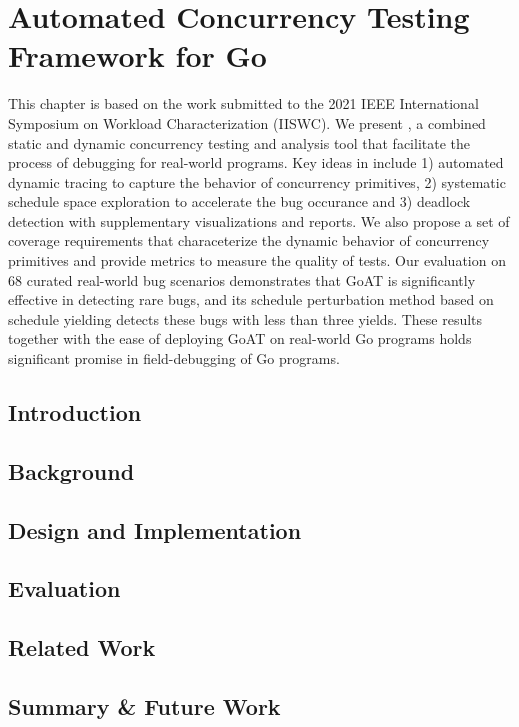 
\chapter{Automated Concurrency Testing Framework for Go}
\label{sec:ch4}

This chapter is based on the work submitted to the 2021 IEEE International Symposium on Workload Characterization (IISWC).
We present \goat, a combined static and dynamic concurrency testing
and analysis tool that facilitate the process of debugging for real-world programs.
%
Key ideas in \goat include
1) automated dynamic tracing to capture the behavior of concurrency primitives,
2) systematic schedule space exploration to accelerate the bug occurance
and 3) deadlock detection with supplementary visualizations and reports.
We also propose a set of coverage requirements that characeterize the dynamic behavior of concurrency primitives and provide metrics to measure the quality of tests.
%
Our evaluation on 68 curated real-world bug scenarios
demonstrates that GoAT is significantly effective in detecting
rare bugs, and its schedule perturbation method based on schedule
yielding detects these bugs with less than three yields.
%
These results together with the ease of deploying GoAT on real-world
Go programs holds significant promise in field-debugging of Go programs.

\section{Introduction}
\label{sec:ch4_intro}



\section{Background}
\label{sec:ch4_bg}


\section{Design and Implementation}
\label{sec:ch4_design}


\section{Evaluation}
\label{sec:ch4_evaluation}


%


\section{Related Work}
\label{sec:ch4_related}



\section{Summary \& Future Work}
\label{sec:ch4_summary}


